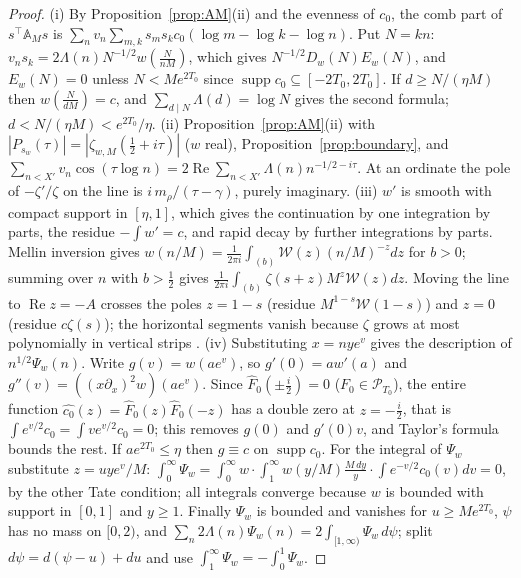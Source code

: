 \documentclass[11pt]{amsart}
\theoremstyle{definition}
\theoremstyle{remark}
\newcommand{\Rel}{\operatorname{Re}}
\newcommand{\supp}{\operatorname{supp}}
\newcommand{\Fh}{\widehat F}
\begin{document}
\begin{proof}
(i) By Proposition~\ref{prop:AM}(ii) and the evenness of $c_0$, the comb part of $s^\top\mathbb A_Ms$ is
$\sum_n v_n\sum_{m,k}s_ms_kc_0(\log m-\log k-\log n)$. Put $N=kn$: $v_ns_k=2\Lambda(n)N^{-1/2}w(\frac N{nM})$, which gives
$N^{-1/2}D_w(N)E_w(N)$, and $E_w(N)=0$ unless $N<Me^{2T_0}$ since $\supp c_0\subseteq[-2T_0,2T_0]$. If $d\ge N/(\eta M)$ then
$w(\frac N{dM})=c$, and $\sum_{d\mid N}\Lambda(d)=\log N$ gives the second formula; $d<N/(\eta M)<e^{2T_0}/\eta$.
(ii) Proposition~\ref{prop:AM}(ii) with $|P_{s_w}(\tau)|=|\zeta_{w,M}(\frac12+i\tau)|$ ($w$ real), Proposition~\ref{prop:boundary}, and
$\sum_{n<X'}v_n\cos(\tau\log n)=2\Rel\sum_{n<X'}\Lambda(n)n^{-1/2-i\tau}$. At an ordinate the pole of $-\zeta'/\zeta$ on the line is
$i\,m_\rho/(\tau-\gamma)$, purely imaginary.
(iii) $w'$ is smooth with compact support in $[\eta,1]$, which gives the continuation by one integration by parts, the residue
$-\int w'=c$, and rapid decay by further integrations by parts. Mellin inversion gives $w(n/M)=\frac1{2\pi i}\int_{(b)}\mathcal W(z)(n/M)^{-z}dz$
for $b>0$; summing over $n$ with $b>\frac12$ gives $\frac1{2\pi i}\int_{(b)}\zeta(s+z)M^z\mathcal W(z)dz$. Moving the line to $\Rel z=-A$
crosses the poles $z=1-s$ (residue $M^{1-s}\mathcal W(1-s)$) and $z=0$ (residue $c\zeta(s)$); the horizontal segments vanish because
$\zeta$ grows at most polynomially in vertical strips \cite[\S5.1]{Titchmarsh1986}.
(iv) Substituting $x=nye^v$ gives the description of $n^{1/2}\Psi_w(n)$. Write $g(v)=w(ae^v)$, so $g'(0)=aw'(a)$ and
$g''(v)=((x\partial_x)^2w)(ae^v)$. Since $\Fh_0(\pm\frac i2)=0$ ($F_0\in\mathcal P_{T_0}$), the entire function
$\widehat{c_0}(z)=\Fh_0(z)\Fh_0(-z)$ has a double zero at $z=-\frac i2$, that is $\int e^{v/2}c_0=\int ve^{v/2}c_0=0$; this removes $g(0)$ and
$g'(0)v$, and Taylor's formula bounds the rest. If $ae^{2T_0}\le\eta$ then $g\equiv c$ on $\supp c_0$. For the integral of $\Psi_w$ substitute
$z=uye^v/M$: $\int_0^\infty\Psi_w=\int_0^\infty w\cdot\int_1^\infty w(y/M)\frac{M\,dy}y\cdot\int e^{-v/2}c_0(v)dv=0$, by the other Tate
condition; all integrals converge because $w$ is bounded with support in $[0,1]$ and $y\ge1$. Finally $\Psi_w$ is bounded and vanishes for
$u\ge Me^{2T_0}$, $\psi$ has no mass on $[0,2)$, and $\sum_n2\Lambda(n)\Psi_w(n)=2\int_{[1,\infty)}\Psi_w\,d\psi$; split $d\psi=d(\psi-u)+du$ and use
$\int_1^\infty\Psi_w=-\int_0^1\Psi_w$.
\end{proof}
\end{document}
